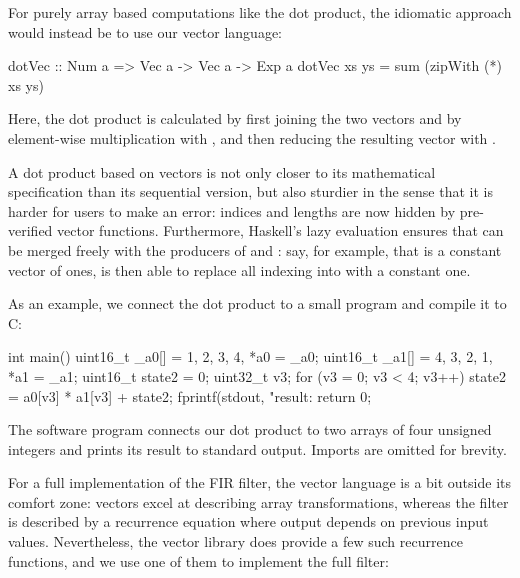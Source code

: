 \documentclass[../paper.tex]{subfiles}
\begin{document}
For purely array based computations like the dot product, the idiomatic approach would instead be to use our vector language:


\begin{code}
dotVec :: Num a => Vec a -> Vec a -> Exp a
dotVec xs ys = sum (zipWith (*) xs ys)
\end{code}

\noindent Here, the dot product is calculated by first joining the two vectors  and  by element-wise multiplication with , and then reducing the resulting vector with .


A dot product based on vectors is not only closer to its mathematical specification than its sequential version, but also sturdier in the sense that it is harder for users to make an error: indices and lengths are now hidden by pre-verified vector functions. Furthermore, Haskell's lazy evaluation ensures that  can be merged freely with the producers of  and : say, for example, that  is a constant vector of ones,  is then able to replace all indexing into  with a constant one.

As an example, we connect the dot product to a small program and compile it to C:

\begin{code}
int main() {
  uint16_t _a0[] = {1, 2, 3, 4}, *a0 = _a0;
  uint16_t _a1[] = {4, 3, 2, 1}, *a1 = _a1;
  uint16_t state2 = 0;
  uint32_t v3;
  for (v3 = 0; v3 < 4; v3++)
    state2 = a0[v3] * a1[v3] + state2;
  fprintf(stdout, "result: %
  return 0;
}
\end{code}

\noindent The software program connects our dot product to two arrays of four unsigned integers and prints its result to standard output. Imports are omitted for brevity.

For a full implementation of the FIR filter, the vector language is a bit outside its comfort zone: vectors excel at describing array transformations, whereas the filter is described by a recurrence equation where output depends on previous input values. Nevertheless, the vector library does provide a few such recurrence functions, and we use one of them to implement the full filter:
\end{document}
